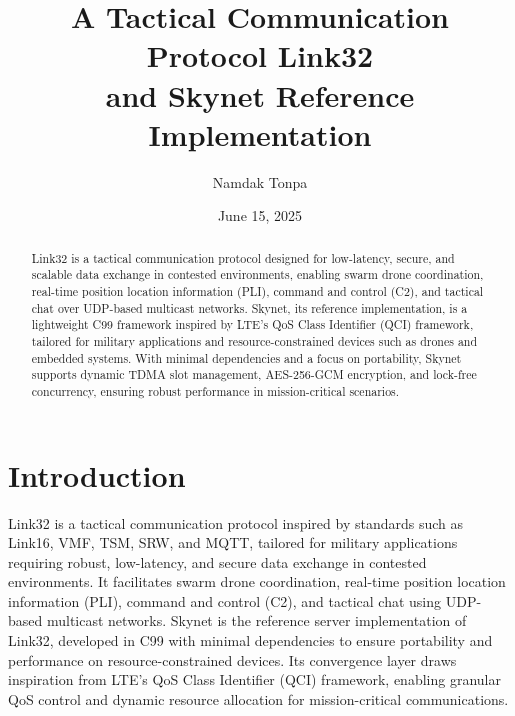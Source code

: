 \documentclass{article}
\begin{document}
\title{A Tactical Communication Protocol Link32 \\ and Skynet Reference Implementation}
\author{Namdak Tonpa}
\date{June 15, 2025}
\maketitle

\begin{abstract}
Link32 is a tactical communication protocol designed for low-latency, secure, and scalable data
exchange in contested environments, enabling swarm drone coordination, real-time position location
information (PLI), command and control (C2), and tactical chat over UDP-based multicast networks.
Skynet, its reference implementation, is a lightweight C99 framework inspired by LTE’s QoS Class
Identifier (QCI) framework, tailored for military applications and resource-constrained devices
such as drones and embedded systems. With minimal dependencies and a focus on portability, Skynet
supports dynamic TDMA slot management, AES-256-GCM encryption, and lock-free concurrency, ensuring
robust performance in mission-critical scenarios.
\end{abstract}

\newpage
\tableofcontents

\newpage
\section{Introduction}
Link32 is a tactical communication protocol inspired by standards such as Link16, VMF, TSM, SRW, and
MQTT, tailored for military applications requiring robust, low-latency, and secure data exchange in
contested environments. It facilitates swarm drone coordination, real-time position location
information (PLI), command and control (C2), and tactical chat using UDP-based multicast networks.
Skynet is the reference server implementation of Link32, developed in C99 with minimal dependencies
to ensure portability and performance on resource-constrained devices. Its convergence layer draws
inspiration from LTE’s QoS Class Identifier (QCI) framework, enabling granular QoS control and
dynamic resource allocation for mission-critical communications.
\end{document}
